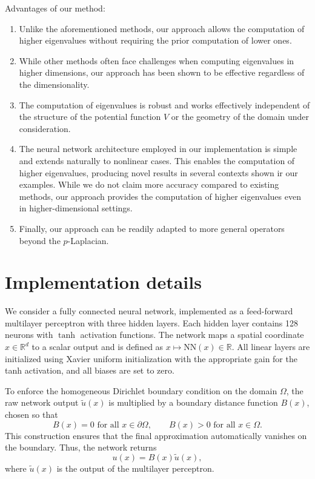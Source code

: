 \documentclass[11pt]{amsart}
\theoremstyle{definition}
\theoremstyle{remark}
\theoremstyle{plain}
\newcommand{\R}{\mathbb{R}}
\begin{document}
Advantages of our method:
\begin{enumerate}
\item  Unlike the aforementioned methods, our approach allows the computation of higher eigenvalues without requiring the prior computation of lower ones.


\item While other methods often face challenges when computing eigenvalues in higher dimensions, our approach has been shown to be effective regardless of the dimensionality.

\item The computation of eigenvalues is robust and works effectively independent of the structure of the potential function $V$ or the geometry of the domain under consideration.

\item The neural network architecture employed in our implementation is simple and extends naturally to nonlinear cases. This enables the computation of higher eigenvalues, producing novel results in several contexts shown ir our examples. While we do not claim more accuracy compared to existing methods, our approach provides the computation of higher eigenvalues even in higher-dimensional settings.


\item Finally, our approach can be readily adapted to more general operators beyond the $p$-Laplacian.
\end{enumerate}



\section{Implementation details}

We consider a  fully connected neural network,  implemented as a feed-forward multilayer perceptron with three hidden layers. Each hidden layer contains 128 neurons with $\tanh$ activation functions. The network maps a  spatial coordinate $x\in \R^d$ to a scalar output and is defined as $
x \mapsto \text{NN}(x) \in \mathbb{R}$. All linear layers are initialized using Xavier uniform initialization with the appropriate gain for the tanh activation, and all biases are set to zero.

To enforce the homogeneous Dirichlet boundary condition on the domain $\Omega$, the raw network output $\tilde u(x)$ is multiplied by a boundary distance function $B(x)$, chosen so that
$$
B(x)=0 \text{ for all } x\in\partial\Omega, \qquad B(x)>0 \text{ for all } x\in\Omega.
$$
This construction ensures that the final approximation automatically vanishes on the boundary. Thus, the network returns
$$
u(x)=B(x)\tilde  u(x),
$$
where $\tilde  u(x)$ is the output of the multilayer perceptron.
\end{document}
